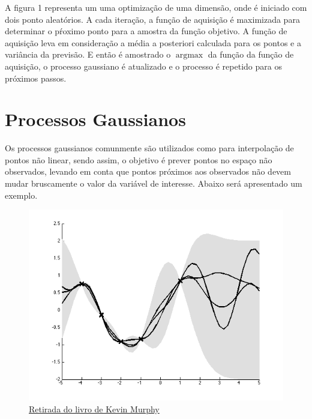 \documentclass[
	12pt,				%
	openright,			%
	twoside,			%
	a4paper,			%
	english,			%
	french,				%
	spanish,			%
	brazil,				%
]{abntex2}
\begin{document}
A figura 1 representa um uma optimização de uma dimensão, onde é
iniciado com dois ponto aleatórios. A cada iteração, a função de
aquisição é maximizada para determinar o pŕoximo ponto para a amostra da
função objetivo. A função de aquisição leva em consideração a média a
posteriori calculada para os pontos e a variância da previsão. E então é
amostrado o \(\operatorname{argmax}\) da função da função de aquisição,
o processo gaussiano é atualizado e o processo é repetido para os
próximos passos.\\

\hypertarget{processos-gaussianos}{%
\section{Processos Gaussianos}\label{processos-gaussianos}}

Os processos gaussianos comunmente são utilizados como para interpolação
de pontos não linear, sendo assim, o objetivo é prever pontos no espaço
não observados, levando em conta que pontos próximos aos observados não
devem mudar bruscamente o valor da variável de interesse. Abaixo será
apresentado um exemplo.\\

\begin{figure}
\centering
\includegraphics[width=\textwidth,height=0.5\textheight]{images/gp.png}
\caption{\href{https://github.com/probml/pmtk3/blob/30d7a1952f3979b16e92dbfa4cd1ce0e402cf7d8/docs/demoOutput/bookDemos/(15)-Gaussian_processes/gprDemoNoiseFree_02.png}{Retirada
do livro de Kevin Murphy}}
\end{figure}
\end{document}
